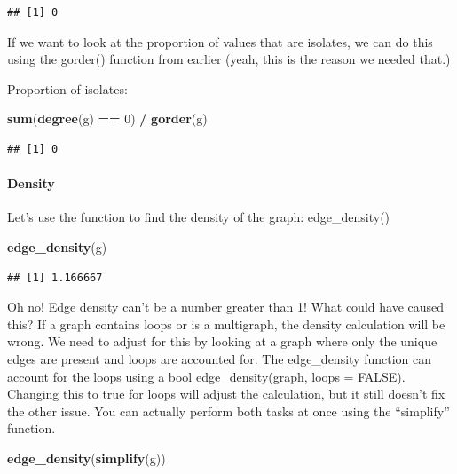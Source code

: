 \documentclass[
]{article}
\newenvironment{Shaded}{\begin{snugshade}}{\end{snugshade}}
\newcommand{\DecValTok}[1]{\textcolor[rgb]{0.00,0.00,0.81}{#1}}
\newcommand{\FunctionTok}[1]{\textcolor[rgb]{0.13,0.29,0.53}{\textbf{#1}}}
\newcommand{\NormalTok}[1]{#1}
\newcommand{\SpecialCharTok}[1]{\textcolor[rgb]{0.81,0.36,0.00}{\textbf{#1}}}
\begin{document}
\begin{verbatim}
## [1] 0
\end{verbatim}

If we want to look at the proportion of values that are isolates, we can
do this using the gorder() function from earlier (yeah, this is the
reason we needed that.)

Proportion of isolates:

\begin{Shaded}
\begin{Highlighting}[]
\FunctionTok{sum}\NormalTok{(}\FunctionTok{degree}\NormalTok{(g) }\SpecialCharTok{==} \DecValTok{0}\NormalTok{) }\SpecialCharTok{/} \FunctionTok{gorder}\NormalTok{(g)}
\end{Highlighting}
\end{Shaded}

\begin{verbatim}
## [1] 0
\end{verbatim}

\paragraph{Density}\label{density}

Let's use the function to find the density of the graph: edge\_density()

\begin{Shaded}
\begin{Highlighting}[]
\FunctionTok{edge\_density}\NormalTok{(g)}
\end{Highlighting}
\end{Shaded}

\begin{verbatim}
## [1] 1.166667
\end{verbatim}

Oh no! Edge density can't be a number greater than 1! What could have
caused this? If a graph contains loops or is a multigraph, the density
calculation will be wrong. We need to adjust for this by looking at a
graph where only the unique edges are present and loops are accounted
for. The edge\_density function can account for the loops using a bool
edge\_density(graph, loops = FALSE). Changing this to true for loops
will adjust the calculation, but it still doesn't fix the other issue.
You can actually perform both tasks at once using the ``simplify''
function.

\begin{Shaded}
\begin{Highlighting}[]
\FunctionTok{edge\_density}\NormalTok{(}\FunctionTok{simplify}\NormalTok{(g))}
\end{Highlighting}
\end{Shaded}
\end{document}

